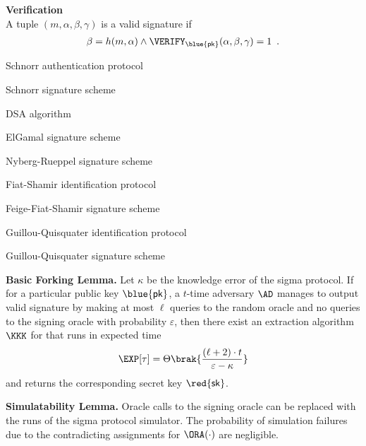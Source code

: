 \documentclass[landscape,footrule]{foils}
\renewcommand{\SK}{{\red{\mathsf{sk}}}}
\renewcommand{\PK}{{\blue{\mathsf{pk}}}}
\begin{document}
\textbf{Verification}\vspace*{1ex}\\
\hspace*{1.5em} A tuple $(m,\alpha,\beta,\gamma)$ is a valid signature
if
\begin{align*}
\beta=h(m,\alpha)\wedge\VERIFY_\PK(\alpha,\beta,\gamma)=1\enspace.  
\end{align*}


Schnorr authentication protocol
\begin{diamonds}
\item Schnorr signature scheme
\item DSA algorithm
\item ElGamal signature scheme
\item Nyberg-Rueppel signature scheme
\end{diamonds}
\vspace*{1cm}

Fiat-Shamir identification protocol 
\begin{diamonds}
  \item Feige-Fiat-Shamir signature scheme 
\end{diamonds}
\vspace*{1cm}

Guillou-Quisquater identification protocol
\begin{diamonds}
  \item Guillou-Quisquater signature scheme 
\end{diamonds}




\textbf{Basic Forking Lemma.}  Let $\kappa$ be the knowledge error of
the sigma protocol. If for a particular public key $\PK$, a $t$-time
adversary $\AD$ manages to output valid signature by making at most
$\ell$ queries to the random oracle and no queries to the signing oracle
with probability $\varepsilon$, then there exist an extraction
algorithm $\KKK$ for that runs in expected time
\begin{align*}
  \EXP[\tau]=\Theta\brak{\frac{(\ell+2)\cdot
      t}{\varepsilon-\kappa}}
\end{align*}
and returns the corresponding secret key $\SK$.\vspace*{1cm}


\textbf{Simulatability Lemma.}  Oracle calls to the signing oracle can
be replaced with the runs of the sigma protocol simulator. The
probability of simulation failures due to the contradicting
assignments for $\ORA(\cdot)$ are negligible.
\end{document}

